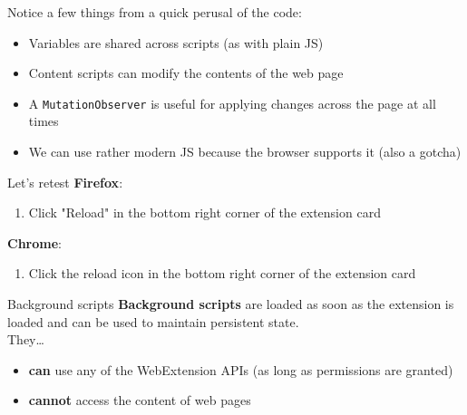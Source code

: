\documentclass[../index.tex]{subfiles}
\begin{document}
\begin{frame}[fragile]{\currenttitle}
  Notice a few things from a quick perusal of the code:

  \begin{itemize}
    \item Variables are shared across scripts (as with plain JS)
    \item Content scripts can modify the contents of the web page
    \item A \texttt{MutationObserver}\footnotemark{} is useful for applying changes across the
          page at all times
    \item We can use rather modern JS because the browser supports it (also a
          gotcha)
  \end{itemize}

\end{frame}

\renewcommand{\currenttitle}{Let's retest}
\begin{frame}{\currenttitle}
  \textbf{Firefox}:
  \begin{enumerate}
    \item Click "Reload" in the bottom right corner of the extension card
  \end{enumerate}

  \textbf{Chrome}:
  \begin{enumerate}
    \item Click the reload icon in the bottom right corner of the extension
          card
  \end{enumerate}
\end{frame}

\renewcommand{\currenttitle}{Background scripts}
\begin{frame}{\currenttitle}
  \textbf{Background scripts}\footnotemark{} are loaded as soon as the extension is loaded and can be
  used to maintain persistent state. \\[1em]

  They\dots
  \begin{itemize}
    \item \textbf{can} use any of the WebExtension APIs (as long as permissions
          are granted)
    \item \textbf{cannot} access the content of web pages
  \end{itemize}

\end{frame}
\end{document}
